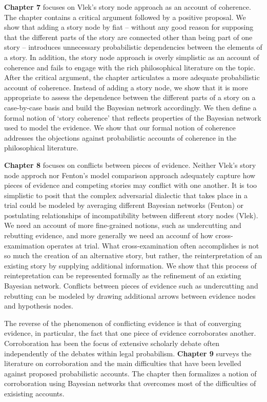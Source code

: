 \documentclass[10pt,dvipsnames,enabledeprecatedfontcommands]{scrartcl}
\begin{document}
\textbf{Chapter 7} focuses on Vlek's story node approach as an account
of coherence. The chapter contains a critical argument followed by a
positive proposal. We show that adding a story node by fiat -- without
any good reason for supposing that the different parts of the story are
connected other than being part of one story -- introduces unnecessary
probabilistic dependencies between the elements of a story. In addition,
the story node approach is overly simplistic as an account of coherence
and fails to engage with the rich philosophical literature on the topic.
After the critical argument, the chapter articulates a more adequate
probabilistic account of coherence. Instead of adding a story node, we
show that it is more appropriate to assess the dependence between the
different parts of a story on a case-by-case basis and build the
Bayesian network accordingly. We then define a formal notion of `story
coherence' that reflects properties of the Bayesian network used to
model the evidence. We show that our formal notion of coherence
addresses the objections against probabilistic accounts of coherence in
the philosophical literature.

\textbf{Chapter 8} focuses on conflicts between pieces of evidence.
Neither Vlek's story node approch nor Fenton's model comparison approach
adequately capture how pieces of evidence and competing stories may
conflict with one another. It is too simplistic to posit that the
complex adversarial dialectic that takes place in a trial could be
modeled by averaging different Bayesian networks (Fenton) or postulating
relationships of incompatibility between different story nodes (Vlek).
We need an account of more fine-grained notions, such as undercutting
and rebutting evidence, and more generally we need an accounf of how
cross-examimation operates at trial. What cross-examination often
accomplishes is not so much the creation of an alternative story, but
rather, the reinterpretation of an existing story by supplying
additional information. We show that this process of reintepretation can
be represented formally as the refinement of an existing Bayesian
network. Conflicts between pieces of evidence such as undercutting and
rebutting can be modeled by drawing additional arrows between evidence
nodes and hypothesis nodes.

The reverse of the phenomenon of conflicting evidence is that of
converging evidence, in particular, the fact that one piece of evidence
corroborates another. Corroboration has been the focus of extensive
scholarly debate often independently of the debates within legal
probabilism. \textbf{Chapter 9} surveys the literature on corroboration
and the main difficulties that have been levelled against proposed
probabilistic accounts. The chapter then formalizes a notion of
corroboration using Bayesian networks that overcomes most of the
difficulties of exisisting accounts.
\end{document}

